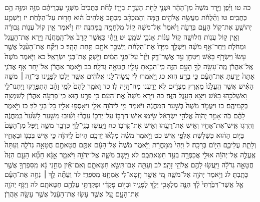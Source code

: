 \documentclass[twoside, openany, parskip=half, 11pt]{book}
\begin{document}
כה טו וַיִּ֜פֶן וַיֵּ֤רֶד מֹשֶׁה֙ מִן־הָהָ֔ר וּשְׁנֵ֛י לֻחֹ֥ת הָעֵדֻ֖ת בְּיָד֑וֹ לֻחֹ֗ת כְּתֻבִים֙ מִשְּׁנֵ֣י עֶבְרֵיהֶ֔ם מִזֶּ֥ה וּמִזֶּ֖ה הֵ֥ם כְּתֻבִֽים׃ טז וְהַ֨לֻּחֹ֔ת מַעֲשֵׂ֥ה אֱלֹהִ֖ים הֵ֑מָּה וְהַמִּכְתָּ֗ב מִכְתַּ֤ב אֱלֹהִים֙ ה֔וּא חָר֖וּת עַל־הַלֻּחֹֽת׃ יז וַיִּשְׁמַ֧ע יְהוֹשֻׁ֛עַ אֶת־ק֥וֹל הָעָ֖ם בְּרֵעֹ֑ה וַיֹּ֙אמֶר֙ אֶל־מֹשֶׁ֔ה ק֥וֹל מִלְחָמָ֖ה בַּֽמַּחֲנֶֽה׃ יח וַיֹּ֗אמֶר אֵ֥ין קוֹל֙ עֲנ֣וֹת גְּבוּרָ֔ה וְאֵ֥ין ק֖וֹל עֲנ֣וֹת חֲלוּשָׁ֑ה ק֣וֹל עַנּ֔וֹת אָנֹכִ֖י שֹׁמֵֽעַ׃ יט וַֽיְהִ֗י כַּאֲשֶׁ֤ר קָרַב֙ אֶל־הַֽמַּחֲנֶ֔ה וַיַּ֥רְא אֶת־הָעֵ֖גֶל וּמְחֹלֹ֑ת וַיִּֽחַר־אַ֣ף מֹשֶׁ֗ה וַיַּשְׁלֵ֤ךְ מִיָּדָו֙ אֶת־הַלֻּחֹ֔ת וַיְשַׁבֵּ֥ר אֹתָ֖ם תַּ֥חַת הָהָֽר׃ כ וַיִּקַּ֞ח אֶת־הָעֵ֨גֶל אֲשֶׁ֤ר עָשׂוּ֙ וַיִּשְׂרֹ֣ף בָּאֵ֔שׁ וַיִּטְחַ֖ן עַ֣ד אֲשֶׁר־דָּ֑ק וַיִּ֙זֶר֙ עַל־פְּנֵ֣י הַמַּ֔יִם וַיַּ֖שְׁקְ אֶת־בְּנֵ֥י יִשְׂרָאֵֽל׃ כא וַיֹּ֤אמֶר מֹשֶׁה֙ אֶֽל־אַהֲרֹ֔ן מֶֽה־עָשָׂ֥ה לְךָ֖ הָעָ֣ם הַזֶּ֑ה כִּֽי־הֵבֵ֥אתָ עָלָ֖יו חֲטָאָ֥ה גְדֹלָֽה׃ כב וַיֹּ֣אמֶר אַהֲרֹ֔ן אַל־יִ֥חַר אַ֖ף אֲדֹנִ֑י אַתָּה֙ יָדַ֣עְתָּ אֶת־הָעָ֔ם כִּ֥י בְרָ֖ע הֽוּא׃ כג וַיֹּ֣אמְרוּ לִ֔י עֲשֵׂה־לָ֣נוּ אֱלֹהִ֔ים אֲשֶׁ֥ר יֵלְכ֖וּ לְפָנֵ֑ינוּ כִּי־זֶ֣ה ׀ מֹשֶׁ֣ה הָאִ֗ישׁ אֲשֶׁ֤ר הֶֽעֱלָ֙נוּ֙ מֵאֶ֣רֶץ מִצְרַ֔יִם לֹ֥א יָדַ֖עְנוּ מֶה־הָ֥יָה לֽוֹ׃ כד וָאֹמַ֤ר לָהֶם֙ לְמִ֣י זָהָ֔ב הִתְפָּרָ֖קוּ וַיִּתְּנוּ־לִ֑י וָאַשְׁלִכֵ֣הוּ בָאֵ֔שׁ וַיֵּצֵ֖א הָעֵ֥גֶל הַזֶּֽה׃ כה וַיַּ֤רְא מֹשֶׁה֙ אֶת־הָעָ֔ם כִּ֥י פָרֻ֖עַ ה֑וּא כִּֽי־פְרָעֹ֣ה אַהֲרֹ֔ן לְשִׁמְצָ֖ה בְּקָמֵיהֶֽם׃ כו וַיַּעֲמֹ֤ד מֹשֶׁה֙ בְּשַׁ֣עַר הַֽמַּחֲנֶ֔ה וַיֹּ֕אמֶר מִ֥י לַיהֹוָ֖ה אֵלָ֑י וַיֵּאָסְפ֥וּ אֵלָ֖יו כׇּל־בְּנֵ֥י לֵוִֽי׃ כז וַיֹּ֣אמֶר לָהֶ֗ם כֹּֽה־אָמַ֤ר יְהֹוָה֙ אֱלֹהֵ֣י יִשְׂרָאֵ֔ל שִׂ֥ימוּ אִישׁ־חַרְבּ֖וֹ עַל־יְרֵכ֑וֹ עִבְר֨וּ וָשׁ֜וּבוּ מִשַּׁ֤עַר לָשַׁ֙עַר֙ בַּֽמַּחֲנֶ֔ה וְהִרְג֧וּ אִֽישׁ־אֶת־אָחִ֛יו וְאִ֥ישׁ אֶת־רֵעֵ֖הוּ וְאִ֥ישׁ אֶת־קְרֹבֽוֹ׃ כח וַיַּֽעֲשׂ֥וּ בְנֵֽי־לֵוִ֖י כִּדְבַ֣ר מֹשֶׁ֑ה וַיִּפֹּ֤ל מִן־הָעָם֙ בַּיּ֣וֹם הַה֔וּא כִּשְׁלֹ֥שֶׁת אַלְפֵ֖י אִֽישׁ׃ כט וַיֹּ֣אמֶר מֹשֶׁ֗ה מִלְא֨וּ יֶדְכֶ֤ם הַיּוֹם֙ לַֽיהֹוָ֔ה כִּ֛י אִ֥ישׁ בִּבְנ֖וֹ וּבְאָחִ֑יו וְלָתֵ֧ת עֲלֵיכֶ֛ם הַיּ֖וֹם בְּרָכָֽה׃ ל וַיְהִי֙ מִֽמׇּחֳרָ֔ת וַיֹּ֤אמֶר מֹשֶׁה֙ אֶל־הָעָ֔ם אַתֶּ֥ם חֲטָאתֶ֖ם חֲטָאָ֣ה גְדֹלָ֑ה וְעַתָּה֙ אֶֽעֱלֶ֣ה אֶל־יְהֹוָ֔ה אוּלַ֥י אֲכַפְּרָ֖ה בְּעַ֥ד חַטַּאתְכֶֽם׃ לא וַיָּ֧שׇׁב מֹשֶׁ֛ה אֶל־יְהֹוָ֖ה וַיֹּאמַ֑ר אָ֣נָּ֗א חָטָ֞א הָעָ֤ם הַזֶּה֙ חֲטָאָ֣ה גְדֹלָ֔ה וַיַּֽעֲשׂ֥וּ לָהֶ֖ם אֱלֹהֵ֥י זָהָֽב׃ לב וְעַתָּ֖ה אִם־תִּשָּׂ֣א חַטָּאתָ֑ם וְאִם־אַ֕יִן מְחֵ֣נִי נָ֔א מִֽסִּפְרְךָ֖ אֲשֶׁ֥ר כָּתָֽבְתָּ׃ לג וַיֹּ֥אמֶר יְהֹוָ֖ה אֶל־מֹשֶׁ֑ה מִ֚י אֲשֶׁ֣ר חָֽטָא־לִ֔י אֶמְחֶ֖נּוּ מִסִּפְרִֽי׃ לד וְעַתָּ֞ה לֵ֣ךְ ׀ נְחֵ֣ה אֶת־הָעָ֗ם אֶ֤ל אֲשֶׁר־דִּבַּ֙רְתִּי֙ לָ֔ךְ הִנֵּ֥ה מַלְאָכִ֖י יֵלֵ֣ךְ לְפָנֶ֑יךָ וּבְי֣וֹם פׇּקְדִ֔י וּפָקַדְתִּ֥י עֲלֵהֶ֖ם חַטָּאתָֽם׃ לה וַיִּגֹּ֥ף יְהֹוָ֖ה אֶת־הָעָ֑ם עַ֚ל אֲשֶׁ֣ר עָשׂ֣וּ אֶת־הָעֵ֔גֶל אֲשֶׁ֥ר עָשָׂ֖ה אַהֲרֹֽן׃
\end{document}
